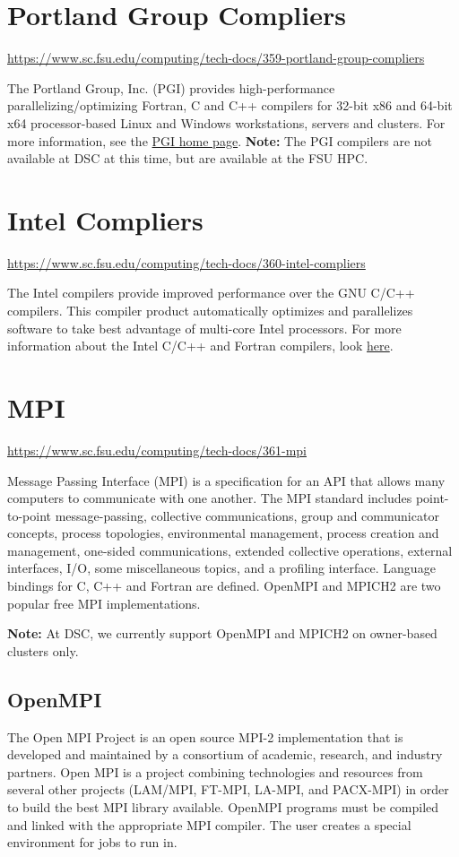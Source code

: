 \documentclass[12pt,a4paper]{article}
\begin{document}
\section{Portland Group Compliers}
\url{https://www.sc.fsu.edu/computing/tech-docs/359-portland-group-compliers}

The Portland Group, Inc. (PGI) provides high-performance parallelizing/optimizing Fortran, C and C++ compilers for 32-bit x86 and 64-bit x64 processor-based Linux and Windows workstations, servers and clusters. For more information, see the \href{https://www.pgroup.com/}{PGI home page}.
\textbf{Note:} The PGI compilers are not available at DSC at this time, but are available at the FSU HPC.

\section{Intel Compliers}
\url{https://www.sc.fsu.edu/computing/tech-docs/360-intel-compliers}

The Intel compilers provide improved performance over the GNU C/C++ compilers. This compiler product automatically optimizes and parallelizes software to take best advantage of multi-core Intel processors. For more information about the Intel C/C++ and Fortran compilers, look \href{https://software.intel.com/en-us/fortran-compilers}{here}.

\section{MPI}
\url{https://www.sc.fsu.edu/computing/tech-docs/361-mpi}

Message Passing Interface (MPI) is a specification for an API that allows many computers to communicate with one another. The MPI standard includes point-to-point message-passing, collective communications, group and communicator concepts, process topologies, environmental management, process creation and management, one-sided communications, extended collective operations, external interfaces, I/O, some miscellaneous topics, and a profiling interface. Language bindings for C, C++ and Fortran are defined. OpenMPI and MPICH2 are two popular free MPI implementations.

\textbf{Note:} At DSC, we currently support OpenMPI and MPICH2 on owner-based clusters only.

\subsection*{OpenMPI}
The Open MPI Project is an open source MPI-2 implementation that is developed and maintained by a consortium of academic, research, and industry partners. Open MPI is a project combining technologies and resources from several other projects (LAM/MPI, FT-MPI, LA-MPI, and PACX-MPI) in order to build the best MPI library available. OpenMPI programs must be compiled and linked with the appropriate MPI compiler. The user creates a special environment for jobs to run in.
\end{document}
